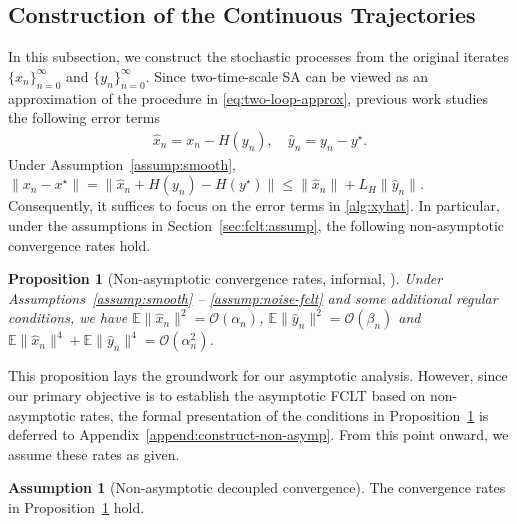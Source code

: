 \documentclass[11pt]{article}
\theoremstyle{plain}
\newtheorem{prop}{Proposition}[section]
\theoremstyle{definition}
\newtheorem{assump}{Assumption}[section]
\def\OM{{\mathcal O}}
\def\EB{{\mathbb E}}
\newcommand{\xhat}{{\hat{x}}}
\newcommand{\yhat}{{\hat{y}}}
\newcommand{\xx}{{x}}
\newcommand{\yy}{{y}}
\begin{document}
\subsection{Construction of the Continuous Trajectories}\label{sec:fclt:construct}

In this subsection, we construct the stochastic processes from the original iterates $ \{ x_{n} \}_{n=0}^\infty $ and $\{ y_{n} \}_{n=0}^\infty $.
Since two-time-scale SA can be viewed as an approximation of the procedure in \eqref{eq:two-loop-approx}, previous work studies the following error terms~\citep{kaledin2020finite, doan2022nonlinear, han2024finite}
\begin{equation}
	\begin{aligned}
		\xhat_{n} = x_{n} - H(y_{n}), \quad 
		\yhat_{n} = y_{n} - y^{\star}.
	\end{aligned}    \label{alg:xyhat}
\end{equation}
Under Assumption~\ref{assump:smooth}, $\| x_{n} - x^\star \|  = \| \xhat_{n} + H(y_{n}) - H(y^\star) \| \le \| \xhat_{n} \|  + L_H \| \yhat_{n} \|$.
Consequently, it suffices to focus on the error terms in \eqref{alg:xyhat}.
In particular, under the assumptions in Section~\ref{sec:fclt:assump}, the following non-asymptotic convergence rates hold.

\begin{prop}[Non-asymptotic convergence rates, informal, {\cite[Theorem~3.1]{han2024finite}}]\label{prop:mart-decouple-rate}
	Under Assumptions~\ref{assump:smooth} -- \ref{assump:noise-fclt} and some additional regular conditions,
	we have
	$\EB \| \xhat_{n} \|^2 = \OM(\alpha_{n}) $, $\EB \| \yhat_{n} \|^2 = \OM(\beta_{n})$ and $\EB \| \xhat_{n} \|^4 + \EB \| \yhat_{n} \|^4 = \OM (\alpha_{n}^2)$.
\end{prop}

This proposition lays the groundwork for our asymptotic analysis. However, since our primary objective is to establish the asymptotic FCLT based on non-asymptotic rates, the formal presentation of the conditions in Proposition~\ref{prop:mart-decouple-rate} is deferred to Appendix~\ref{append:construct-non-asymp}. From this point onward, we assume these rates as given.
\begin{assump}[Non-asymptotic decoupled convergence]\label{assump:mart-decouple-rate}
	The convergence rates in Proposition~\ref{prop:mart-decouple-rate} hold.
\end{assump}
\end{document}
